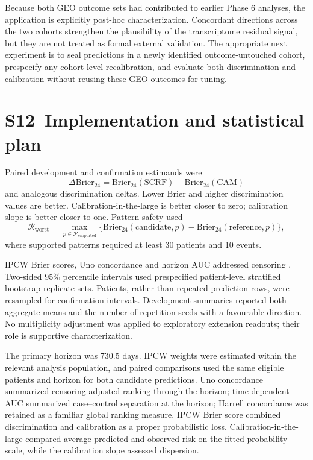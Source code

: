 \documentclass[pdflatex,sn-nature]{sn-jnl}
\begin{document}
Because both GEO outcome sets had contributed to earlier Phase 6 analyses, the application is explicitly post-hoc characterization. Concordant directions across the two cohorts strengthen the plausibility of the transcriptome residual signal, but they are not treated as formal external validation. The appropriate next experiment is to seal predictions in a newly identified outcome-untouched cohort, prespecify any cohort-level recalibration, and evaluate both discrimination and calibration without reusing these GEO outcomes for tuning.

\section*{S12~Implementation and statistical plan}
Paired development and confirmation estimands were
\begin{equation}
\Delta\mathrm{Brier}_{24}=\mathrm{Brier}_{24}(\mathrm{SCRF})-\mathrm{Brier}_{24}(\mathrm{CAM})
\end{equation}
and analogous discrimination deltas. Lower Brier and higher discrimination values are better. Calibration-in-the-large is better closer to zero; calibration slope is better closer to one. Pattern safety used
\begin{equation}
\mathcal{R}_{\mathrm{worst}}=\max_{p\in\mathcal{P}_{\mathrm{supported}}}
\{\mathrm{Brier}_{24}(\mathrm{candidate},p)-\mathrm{Brier}_{24}(\mathrm{reference},p)\},
\end{equation}
where supported patterns required at least 30 patients and 10 events.

IPCW Brier scores, Uno concordance and horizon AUC addressed censoring \cite{graf1999,uno2011}. Two-sided 95\% percentile intervals used prespecified patient-level stratified bootstrap replicate sets. Patients, rather than repeated prediction rows, were resampled for confirmation intervals. Development summaries reported both aggregate means and the number of repetition seeds with a favourable direction. No multiplicity adjustment was applied to exploratory extension readouts; their role is supportive characterization.

The primary horizon was 730.5 days. IPCW weights were estimated within the relevant analysis population, and paired comparisons used the same eligible patients and horizon for both candidate predictions. Uno concordance summarized censoring-adjusted ranking through the horizon; time-dependent AUC summarized case--control separation at the horizon; Harrell concordance was retained as a familiar global ranking measure. IPCW Brier score combined discrimination and calibration as a proper probabilistic loss. Calibration-in-the-large compared average predicted and observed risk on the fitted probability scale, while the calibration slope assessed dispersion.
\end{document}
